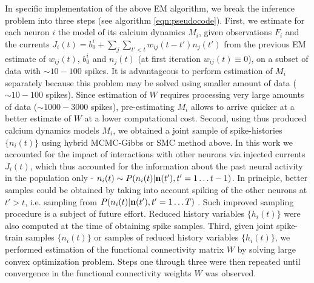 In specific implementation of the above EM algorithm, we break the inference problem into three steps (see algorithm \ref{eqn:pseudocode}).  First, we estimate for each neuron $i$ the model of its calcium dynamics $M_i$, given observations $F_i$ and the currents $J_i(t)=b^i_0+\sum_{j}\sum_{t'<t}w_{ij}(t-t')n_{j}(t')$ from the previous EM estimate of $w_{ij}(t)$, $b^i_0$ and $n_{j}(t)$ (at first iteration $w_{ij}(t) \equiv 0$), on a subset of data with $\sim 10-100$ spikes.  It is advantageous to perform estimation of $M_i$ separately because this problem may be solved using smaller amount of data ($\sim 10-100$ spikes). Since estimation of $W$ requires processing very large amounts of data ($\sim 1000-3000$ spikes), pre-estimating $M_i$ allows to arrive quicker at a better estimate of $W$ at a lower computational cost.  Second, using thus produced calcium dynamics models $M_i$, we obtained a joint sample of spike-histories $\{ n_i(t)\}$ using hybrid MCMC-Gibbs or SMC method above.  In this work we accounted for the impact of interactions with other neurons via injected currents $J_i(t)$, which thus accounted for the information about the past neural activity in the population only - $n_i(t) \sim P(n_i(t)|{\bf n}(t'), {t'=1\ldots t-1})$. In principle, better samples could be obtained by taking into account spiking of the other neurons at $t'>t$, i.e. sampling from $P(n_i(t)|{\bf n}(t'), {t'=1\ldots T})$ \cite{PL07}. Such improved sampling procedure is a subject of future effort.  Reduced history variables $\{h_i(t)\}$ were also computed at the time of obtaining spike samples.  Third, given joint spike-train samples $\{ n_i(t)\}$ or samples of reduced history variables $\{ h_i(t)\}$, we performed estimation of the functional connectivity matrix $W$ by solving large convex optimization problem.  Steps one through three were then repeated until convergence in the functional connectivity weights $W$ was observed.

